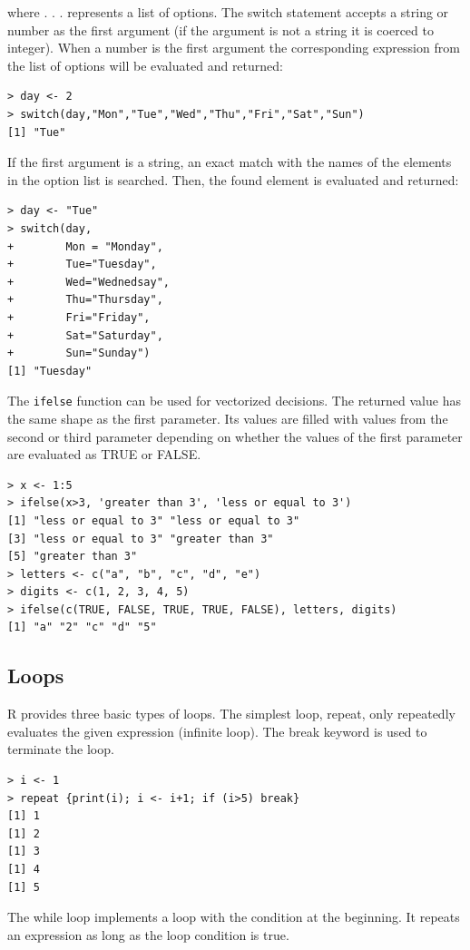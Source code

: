 \documentclass[11pt,openany,executivepaper]{book}
\begin{document}
where . . . represents a list of options. The switch statement accepts a string or number as the first argument (if the argument is not a string it is coerced to integer). When a number is the first argument the corresponding expression from the list of options will be evaluated and returned:

\begin{verbatim}
> day <- 2
> switch(day,"Mon","Tue","Wed","Thu","Fri","Sat","Sun")
[1] "Tue"
\end{verbatim}

If the first argument is a string, an exact match with the names of the elements in the option list is searched. Then, the found element is evaluated and returned:

\begin{verbatim}
> day <- "Tue"
> switch(day,
+        Mon = "Monday",
+        Tue="Tuesday",
+        Wed="Wednedsay",
+        Thu="Thursday",
+        Fri="Friday",
+        Sat="Saturday",
+        Sun="Sunday")
[1] "Tuesday"
\end{verbatim}

The \verb|ifelse| function can be used for vectorized decisions. The returned value has the same shape as the first parameter. Its values are filled with values from the second or third parameter depending on whether the values of the first parameter are evaluated as TRUE or FALSE.

\begin{verbatim}
> x <- 1:5
> ifelse(x>3, 'greater than 3', 'less or equal to 3')
[1] "less or equal to 3" "less or equal to 3"
[3] "less or equal to 3" "greater than 3"
[5] "greater than 3"
> letters <- c("a", "b", "c", "d", "e")
> digits <- c(1, 2, 3, 4, 5)
> ifelse(c(TRUE, FALSE, TRUE, TRUE, FALSE), letters, digits)
[1] "a" "2" "c" "d" "5"
\end{verbatim}

\subsection{Loops}
R provides three basic types of loops. The simplest loop, repeat, only repeatedly evaluates the given expression (infinite loop). The break keyword is used to terminate the loop.

\begin{verbatim}
> i <- 1
> repeat {print(i); i <- i+1; if (i>5) break}
[1] 1
[1] 2
[1] 3
[1] 4
[1] 5
\end{verbatim}

The while loop implements a loop with the condition at the beginning. It repeats an expression as long as the loop condition is true.
\end{document}

